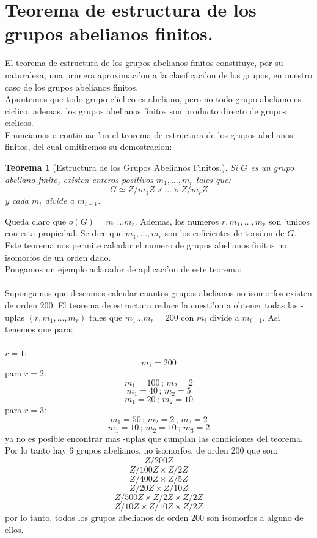 \documentclass[a4paper,openright,12pt]{report}
\numberwithin{equation}{section} %
\newtheorem{teorema}{Teorema}[section] %
\begin{document}
\section{Teorema de estructura de los grupos abelianos finitos.}
El teorema de estructura de los grupos abelianos finitos constituye, por su naturaleza, una primera aproximaci'on a la clasificaci'on de los grupos, en nuestro caso de los grupos abelianos finitos.\\
Apuntemos que todo grupo c'iclico es abeliano, pero no todo grupo abeliano es ciclico, ademas, los grupos abelianos finitos son producto directo de grupos ciclicos.\\
Enunciamos a continuaci'on el teorema de estructura de los grupos abelianos finitos, del cual omitiremos su demostracion:
\begin{teorema}[Estructura de los Grupos Abelianos Finitos.]
Si $G$ es un grupo abeliano finito, existen enteros positivos $m_{1},\ldots ,m_{r}$ tales que:
\[
G \simeq Z/m_{1}Z \times \ldots \times Z/m_{r}Z
\]
y cada $m_{i}$ divide a $m_{i-1}$.
\end{teorema}
Queda claro que $o(G)=m_{1}\ldots m_{r}$. Ademas, los numeros $r, m_{1},\ldots ,m_{r}$ son 'unicos con esta propiedad. Se dice que $m_{1},\ldots ,m_{r}$ son los coficientes de torsi'on de $G$.\\
Este teorema nos permite calcular el numero de grupos abelianos finitos no isomorfos de un orden dado.\\
Pongamos un ejemplo aclarador de aplicaci'on de este teorema:\\
\\
Supongamos que deseamos calcular cuantos grupos abelianos no isomorfos existen de orden 200. El teorema de estructura reduce la cuesti'on a obtener todas las -uplas $(r,m_{1},\ldots ,m_{r})$ tales que $m_{1}\ldots m_{r}=200$ con $m_{i}$ divide a $m_{i-1}$. Asi tenemos que para:\\
\\
$r=1$:
\[
m_{1}=200
\] 
para $r=2$:
\[
m_{1}=100\, ; \,m_{2}=2
\]
\[
m_{1}=40\, ; \,m_{2}=5
\]
\[
m_{1}=20\, ; \,m_{2}=10
\]
para $r=3$:
\[
m_{1}=50\, ; \,m_{2}=2\, ; \, m_{3}=2
\]
\[
m_{1}=10\, ; \,m_{2}=10\, ; \, m_{3}=2
\]
ya no es posible encontrar mas -uplas que cumplan las condiciones del teorema. Por lo tanto hay 6 grupos abelianos, no isomorfos, de orden 200 que son:
\[
Z/200Z
\]
\[
Z/100Z \times Z/2Z
\]
\[
Z/400Z \times Z/5Z
\]
\[
Z/20Z \times Z/10Z
\]
\[
Z/500Z \times Z/2Z \times Z/2Z
\]
\[
Z/10Z \times Z/10Z \times Z/2Z
\]
por lo tanto, todos los grupos abelianos de orden 200 son isomorfos a alguno de ellos.
\end{document}
